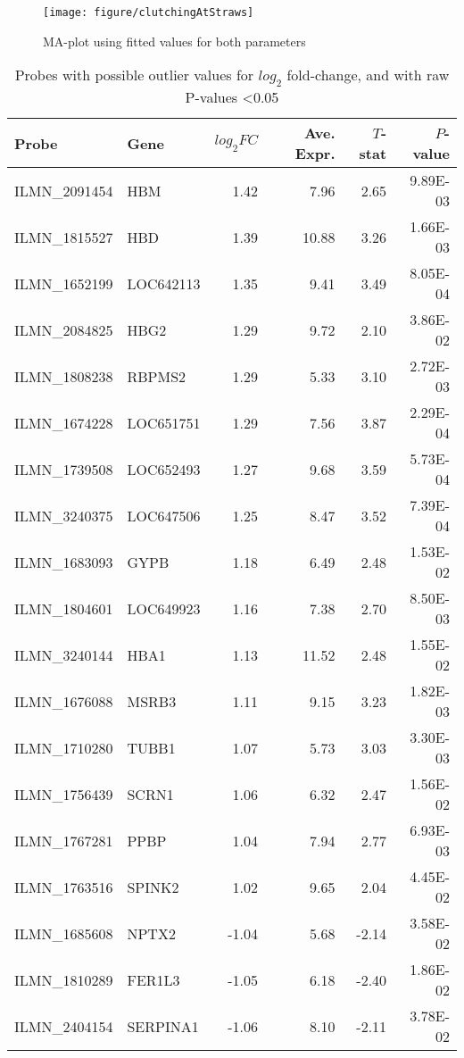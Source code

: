 \documentclass{article}\usepackage{knitr}
\begin{document}
\begin{knitrout}
\color{fgcolor}\begin{figure}[]


{\centering \texttt{[image: figure/clutchingAtStraws]} 

}

\caption[MA-plot using fitted values for both parameters]{MA-plot using fitted values for both parameters\label{fig:clutchingAtStraws}}
\end{figure}


\end{knitrout}
\begin{table}[ht]
\centering
\caption{Probes with possible outlier values for $log_2$ fold-change, and with raw P-values \textless 0.05} 
\label{tab:straws}
{\small
\begin{tabular}{llrrrr}
  \toprule 
 Probe & Gene & $log_2FC$ & Ave. Expr. & $T$-stat & $P$-value \\
 \midrule 
 ILMN\_2091454 & HBM & 1.42 & 7.96 & 2.65 & 9.89E-03 \\ 
  ILMN\_1815527 & HBD & 1.39 & 10.88 & 3.26 & 1.66E-03 \\ 
  ILMN\_1652199 & LOC642113 & 1.35 & 9.41 & 3.49 & 8.05E-04 \\ 
  ILMN\_2084825 & HBG2 & 1.29 & 9.72 & 2.10 & 3.86E-02 \\ 
  ILMN\_1808238 & RBPMS2 & 1.29 & 5.33 & 3.10 & 2.72E-03 \\ 
  ILMN\_1674228 & LOC651751 & 1.29 & 7.56 & 3.87 & 2.29E-04 \\ 
  ILMN\_1739508 & LOC652493 & 1.27 & 9.68 & 3.59 & 5.73E-04 \\ 
  ILMN\_3240375 & LOC647506 & 1.25 & 8.47 & 3.52 & 7.39E-04 \\ 
  ILMN\_1683093 & GYPB & 1.18 & 6.49 & 2.48 & 1.53E-02 \\ 
  ILMN\_1804601 & LOC649923 & 1.16 & 7.38 & 2.70 & 8.50E-03 \\ 
  ILMN\_3240144 & HBA1 & 1.13 & 11.52 & 2.48 & 1.55E-02 \\ 
  ILMN\_1676088 & MSRB3 & 1.11 & 9.15 & 3.23 & 1.82E-03 \\ 
  ILMN\_1710280 & TUBB1 & 1.07 & 5.73 & 3.03 & 3.30E-03 \\ 
  ILMN\_1756439 & SCRN1 & 1.06 & 6.32 & 2.47 & 1.56E-02 \\ 
  ILMN\_1767281 & PPBP & 1.04 & 7.94 & 2.77 & 6.93E-03 \\ 
  ILMN\_1763516 & SPINK2 & 1.02 & 9.65 & 2.04 & 4.45E-02 \\ 
  ILMN\_1685608 & NPTX2 & -1.04 & 5.68 & -2.14 & 3.58E-02 \\ 
  ILMN\_1810289 & FER1L3 & -1.05 & 6.18 & -2.40 & 1.86E-02 \\ 
  ILMN\_2404154 & SERPINA1 & -1.06 & 8.10 & -2.11 & 3.78E-02 \\ 
   \bottomrule 
\end{tabular}
}
\end{table}
\end{document}
